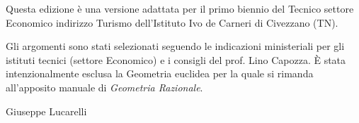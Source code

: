 Questa edizione è una versione adattata per il primo biennio del Tecnico settore Economico indirizzo Turismo dell'Istituto Ivo de Carneri di Civezzano (TN).

Gli argomenti sono stati selezionati seguendo le indicazioni ministeriali per gli istituti tecnici (settore Economico) e i consigli del prof. Lino Capozza. È stata intenzionalmente esclusa la Geometria euclidea per la quale si rimanda all'apposito manuale di \emph{Geometria Razionale}.

\begin{flushright}
Giuseppe Lucarelli
\end{flushright}

